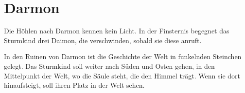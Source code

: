 \documentclass[12pt,a4paper,onecolumn,twoside,ngerman]{book}
\begin{document}
\section{Darmon}
Die Höhlen nach Darmon kennen kein Licht. In der Finsternis begegnet das Sturmkind drei Daimon, die verschwinden, sobald sie diese anruft.

In den Ruinen von Darmon ist die Geschichte der Welt in funkelnden Steinchen gelegt. Das Sturmkind soll weiter nach Süden und Osten gehen, in den Mittelpunkt der Welt, wo die Säule steht, die den Himmel trägt. Wenn sie dort hinaufsteigt, soll ihren Platz in der Welt sehen.
\end{document}
